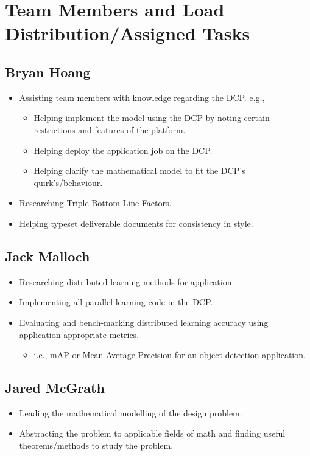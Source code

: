 \documentclass[../mthe-493-project-proposal.tex]{subfiles}
\begin{document}
    \chapter{Team Members and Load Distribution/Assigned Tasks}
    \label{ch:team-load-distribution}

    \section{Bryan Hoang}
    \begin{itemize}
        \item Assisting team members with knowledge regarding the DCP. e.g.,
              \begin{itemize}
                  \item Helping implement the model using the DCP by noting certain restrictions and features of the platform.
                  \item Helping deploy the application job on the DCP.
                  \item Helping clarify the mathematical model to fit the DCP's quirk's/behaviour.
              \end{itemize}
        \item Researching Triple Bottom Line Factors.
        \item Helping typeset deliverable documents for consistency in style.
    \end{itemize}

    \section{Jack Malloch}
    \begin{itemize}
        \item Researching distributed learning methods for application.
        \item Implementing all parallel learning code in the DCP.
        \item Evaluating and bench-marking distributed learning accuracy using application appropriate metrics.
              \begin{itemize}
                  \item i.e., mAP or Mean Average Precision for an object detection application.
              \end{itemize}
    \end{itemize}

    \section{Jared McGrath}
    \begin{itemize}
        \item Leading the mathematical modelling of the design problem.
        \item Abstracting the problem to applicable fields of math and finding useful theorems/methods to study the problem.
    \end{itemize}
\end{document}
